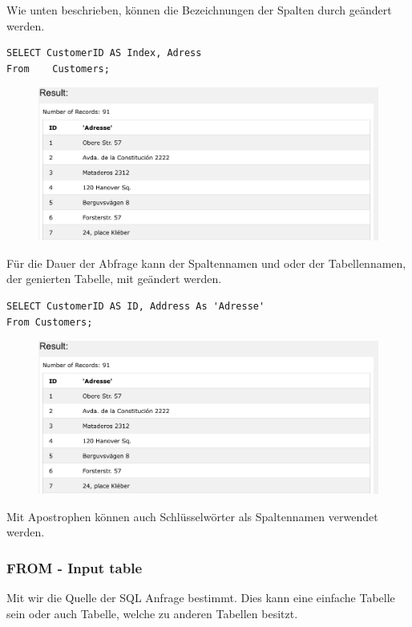 Wie unten beschrieben, können die Bezeichnungen der Spalten durch  geändert werden.

\begin{lstlisting}[style=SQL]
SELECT CustomerID AS Index, Adress
From	Customers;
\end{lstlisting}

\begin{figure}[H]
	\centering
	\includegraphics[scale = 0.3]{attachment/chapter_3/Scc050}
	\caption{}
	\label{fig:Scc050}
\end{figure}

Für die Dauer der Abfrage kann der Spaltennamen und oder der Tabellennamen, der genierten Tabelle, mit  geändert werden.

\begin{lstlisting}[style=SQL]
SELECT CustomerID AS ID, Address As 'Adresse'
From Customers;
\end{lstlisting} 

\begin{figure}[H]
	\centering
	\includegraphics[scale = 0.3]{attachment/chapter_3/Scc050}
	\caption{}
	\label{fig:Scc050}
\end{figure}

Mit Apostrophen können auch Schlüsselwörter als Spaltennamen verwendet werden.

\subsubsection{FROM - Input table}
Mit  wir die Quelle der SQL Anfrage bestimmt. Dies kann eine einfache Tabelle sein oder auch Tabelle, welche  zu anderen Tabellen besitzt.

